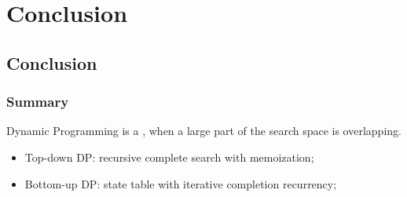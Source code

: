 \documentclass{beamer}
\begin{document}
%


\section{Conclusion}
\subsection{Conclusion}
\begin{frame}
   \frametitle{Summary}

   Dynamic Programming is a , when a large part of the search space is overlapping.

   \begin{itemize}
   \item \alert{Top-down DP}: recursive complete search with memoization;
   \item \alert{Bottom-up DP}: state table with iterative completion recurrency;
   \end{itemize}

   \vfill

\end{frame}
\end{document}
